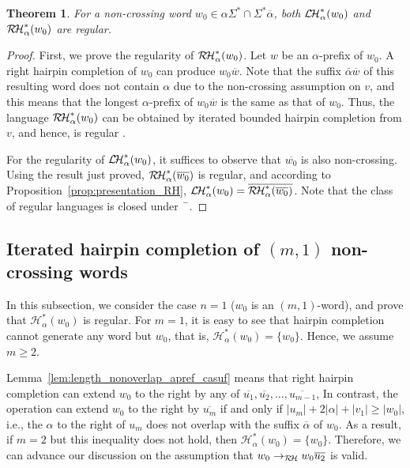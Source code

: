 \documentclass{article}
\theoremstyle{plain}
\newtheorem{theorem}{Theorem}
\theoremstyle{remark}
\newcommand{\LHC}{\ensuremath{\mathcal{L\hspace*{-0.5mm}H}}}
\newcommand{\RHC}{\ensuremath{\mathcal{R\hspace*{-0.5mm}H}}}
\newcommand{\HC}{\ensuremath{\mathcal{H}}}
\newcommand{\calpha}{\ensuremath{\overline{\alpha}}}
\begin{document}
\begin{theorem}\label{thm:nonx_oneside_regular}
	For a non-crossing word $w_0 \in \alpha \Sigma^* \cap \Sigma^* \overline{\alpha}$, both $\LHC_\alpha^*(w_0)$ and $\RHC_\alpha^*(w_0)$ are regular. 
\end{theorem}
\begin{proof}
	First, we prove the regularity of $\RHC_\alpha^*(w_0)$. 
	Let $w$ be an $\alpha$-prefix of $w_0$. 
	A right hairpin completion of $w_0$ can produce $w_0\overline{w}$. 
	Note that the suffix $\bar{\alpha}\overline{w}$ of this resulting word does not contain $\alpha$ due to the non-crossing assumption on $v$, and this means that the longest $\alpha$-prefix of $w_0\overline{w}$ is the same as that of $w_0$. 
	Thus, the language $\RHC_\alpha^*(w_0)$ can be obtained by iterated bounded hairpin completion from $v$, and hence, is regular \cite{Kopecki10}. 

	For the regularity of $\LHC_\alpha^*(w_0)$, it suffices to observe that $\overline{w_0}$ is also non-crossing. 
	Using the result just proved, $\RHC_\alpha^*(\overline{w_0})$ is regular, and according to Proposition~\ref{prop:presentation_RH}, $\LHC_\alpha^*(w_0) = \overline{\RHC_\alpha^*(\overline{w_0})}$. 
	Note that the class of regular languages is closed under $\bar{\hspace{2mm}}$. 
\end{proof}

\subsection{Iterated hairpin completion of $(m, 1)$ non-crossing words}

In this subsection, we consider the case $n = 1$ ($w_0$ is an $(m, 1)$-word), and prove that $\HC_\alpha^*(w_0)$ is regular. 
For $m = 1$, it is easy to see that hairpin completion cannot generate any word but $w_0$, that is, $\HC_\alpha^*(w_0) = \{w_0\}$. 
Hence, we assume $m \ge 2$. 

Lemma~\ref{lem:length_nonoverlap_apref_casuf} means that right hairpin completion can extend $w_0$ to the right by any of $\overline{u_1}, \overline{u_2}, \ldots, \overline{u_{m-1}}$, 
In contrast, the operation can extend $w_0$ to the right by $\overline{u_m}$ if and only if $|u_m| + 2|\alpha| + |v_1| \ge |w_0|$, i.e., the $\alpha$ to the right of $u_m$ does not overlap with the suffix $\calpha$ of $w_0$. 
As a result, if $m = 2$ but this inequality does not hold, then $\HC_\alpha^*(w_0) = \{w_0\}$. 
Therefore, we can advance our discussion on the assumption that $w_0 \to_{\RHC} w_0 \overline{u_2}$ is valid. 
\end{document}
